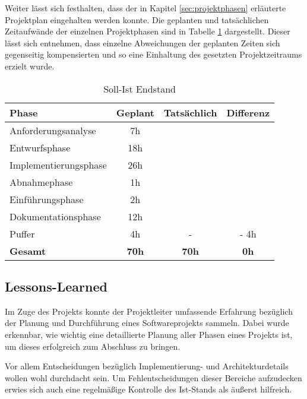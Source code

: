 \documentclass[12pt, xcolor=dvipsnames]{scrartcl}
\begin{document}
Weiter lässt sich festhalten, dass der in Kapitel \ref{sec:projektphasen} erläuterte Projektplan eingehalten werden konnte. Die geplanten und tatsächlichen Zeitaufwände der einzelnen Projektphasen sind in Tabelle \ref{tab:phasen_soll_ist} dargestellt. Dieser lässt sich entnehmen, dass einzelne Abweichungen der geplanten Zeiten sich gegenseitig kompensierten und so eine Einhaltung des gesetzten Projektzeitraums erzielt wurde.

\begin{table}[H]
	\centering
	\begin{tabular}{lccc}

		\rowcolor{white!15}				
		\textbf{Phase} & \textbf{Geplant} & \textbf{Tatsächlich} & \textbf{Differenz} \\\hline		
		
		Anforderungsanalyse 	& 7h 	& \timeAnalyse 			& \timeAnalyseDiff \\
		Entwurfsphase 			& 18h 	& \timeEntwurf 			& \timeEntwurfDiff \\
		Implementierungsphase	& 26h	& \timeImplementierung	& \timeImplementierungDiff \\
		Abnahmephase			& 1h	& \timeAbnahme			& \timeAbnahmeDiff \\
		Einführungsphase		& 2h	& \timeEinfuehrung		& \timeEinfuehrungDiff \\
		Dokumentationsphase		& 12h	& \timeDokumentation	& \timeDokumentationDiff \\
		Puffer					& 4h	& -						& - 4h \\\hline

		\rowcolor{white!15}				
		\textbf{Gesamt} & \textbf{70h} & \textbf{70h} & \textbf{0h} \\			

	    
	\end{tabular}
	\caption{Soll-Ist Endstand}
	\label{tab:phasen_soll_ist}
\end{table}

\subsection{Lessons-Learned}

Im Zuge des Projekts konnte der Projektleiter umfassende Erfahrung bezüglich der Planung und Durchführung eines Softwareprojekts sammeln. Dabei wurde erkennbar, wie wichtig eine detaillierte Planung aller Phasen eines Projekts ist, um dieses erfolgreich zum Abschluss zu bringen.


Vor allem Entscheidungen bezüglich Implementierung- und Architekturdetails wollen wohl durchdacht sein. Um Fehlentscheidungen dieser Bereiche aufzudecken erwies sich auch eine regelmäßige Kontrolle des Ist-Stands als äußerst hilfreich.
\end{document}
